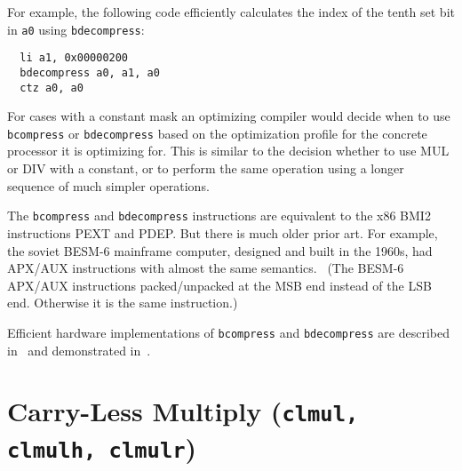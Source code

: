 For example, the following code efficiently calculates the index of the tenth
set bit in {\tt a0} using \texttt{bdecompress}:

\begin{minipage}{\linewidth}
\begin{verbatim}
  li a1, 0x00000200
  bdecompress a0, a1, a0
  ctz a0, a0
\end{verbatim}
\end{minipage}

For cases with a constant mask an optimizing compiler would decide when to use
\texttt{bcompress} or \texttt{bdecompress} based on the optimization profile for the
concrete processor it is optimizing for. This is similar to the decision
whether to use MUL or DIV with a constant, or to perform the same operation
using a longer sequence of much simpler operations.

The \texttt{bcompress} and \texttt{bdecompress} instructions are equivalent to the x86 BMI2
instructions PEXT and PDEP. But there is much older prior art. For example, the
soviet BESM-6 mainframe computer, designed and built in the 1960s, had APX/AUX
instructions with almost the same semantics.~\cite{BESM6} (The BESM-6 APX/AUX
instructions packed/unpacked at the MSB end instead of the LSB end. Otherwise
it is the same instruction.)

Efficient hardware implementations of \texttt{bcompress} and \texttt{bdecompress} are described
in~\cite{Hilewitz06} and demonstrated in~\cite{Wolf17B}.

%
%
%
%
%
%
%
%


\section{Carry-Less Multiply (\texttt{clmul, clmulh, clmulr})}

